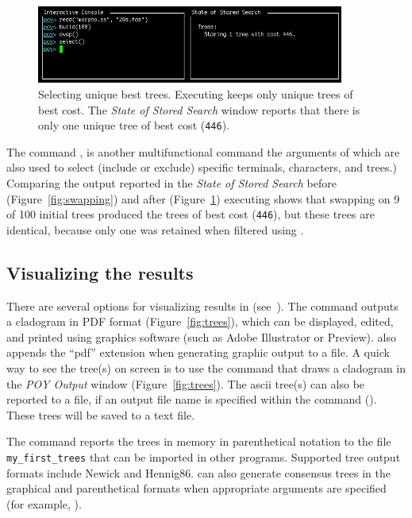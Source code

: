 {\begin{figure}[]
\begin{center}
\includegraphics[width=0.9\textwidth]{doc/figures/select.jpg}
\end{center}
\caption{Selecting unique best trees. Executing  
keeps only unique trees of best cost. The \emph{State of Stored Search} 
window reports that there is only one unique tree of best cost (\texttt{446}).}
\label{fig:select}
\end{figure}

The command , is another multifunctional
command the arguments of which are also used to select (include or
exclude) specific terminals, characters, and trees.) Comparing the
output reported in the \emph{State of Stored Search} before
(Figure~\ref{fig:swapping}) and after (Figure~\ref{fig:select})
executing  shows that swapping on 9 of 100
initial trees produced the trees of best cost (\texttt{446}), but
these trees are identical, because only one was retained when
filtered using .

\subsection{Visualizing the results}

There are several options for visualizing results in \poy
(see~). The command  
outputs a cladogram in PDF format (Figure~\ref{fig:trees}),
which can be displayed, edited, and printed using graphics software
(such as Adobe Illustrator or Preview).  \poy also appends the
``pdf'' extension when generating graphic output to a file. A quick
way to see the tree(s) on screen is to use the command
 that draws a cladogram in the
\emph{POY Output} window (Figure~\ref{fig:trees}). The ascii tree(s)
can also be reported to a file, if an output file name is specified
within the command ().  These trees will be saved to a text file.

The command 
reports the trees in memory in parenthetical notation to the file
\texttt{my\_first\_trees} that can be imported in other programs.
Supported tree output formats include Newick and Hennig86.
 can also generate consensus trees in the
graphical and parenthetical formats when appropriate arguments are
specified (for example, ).

}
